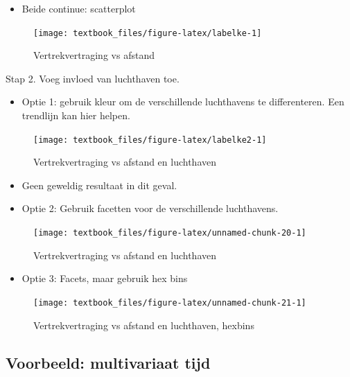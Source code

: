 \documentclass[]{tufte-book}
\providecommand{\tightlist}{%
  \setlength{\itemsep}{0pt}\setlength{\parskip}{0pt}}
\begin{document}
\begin{itemize}
\tightlist
\item
  Beide continue: scatterplot
\end{itemize}

\begin{figure}
\texttt{[image: textbook\_files/figure-latex/labelke-1]} \caption[Vertrekvertraging vs afstand]{Vertrekvertraging vs afstand}\label{fig:labelke}
\end{figure}

Stap 2. Voeg invloed van luchthaven toe.

\begin{itemize}
\tightlist
\item
  Optie 1: gebruik kleur om de verschillende luchthavens te differenteren. Een trendlijn kan hier helpen.
\end{itemize}

\begin{figure}
\texttt{[image: textbook\_files/figure-latex/labelke2-1]} \caption[Vertrekvertraging vs afstand en luchthaven]{Vertrekvertraging vs afstand en luchthaven}\label{fig:labelke2}
\end{figure}

\begin{itemize}
\item
  Geen geweldig resultaat in dit geval.
\item
  Optie 2: Gebruik facetten voor de verschillende luchthavens.
\end{itemize}

\begin{figure}
\texttt{[image: textbook\_files/figure-latex/unnamed-chunk-20-1]} \caption[Vertrekvertraging vs afstand en luchthaven]{Vertrekvertraging vs afstand en luchthaven}\label{fig:unnamed-chunk-20}
\end{figure}

\begin{itemize}
\tightlist
\item
  Optie 3: Facets, maar gebruik hex bins
\end{itemize}

\begin{figure}
\texttt{[image: textbook\_files/figure-latex/unnamed-chunk-21-1]} \caption[Vertrekvertraging vs afstand en luchthaven, hexbins]{Vertrekvertraging vs afstand en luchthaven, hexbins}\label{fig:unnamed-chunk-21}
\end{figure}

\hypertarget{voorbeeld-multivariaat-tijd}{%
\subsection{Voorbeeld: multivariaat tijd}\label{voorbeeld-multivariaat-tijd}}
\end{document}
